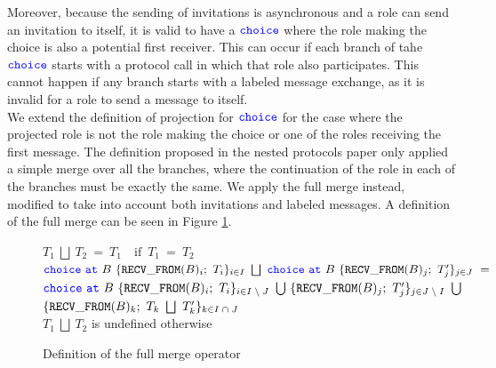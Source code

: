 \documentclass[12pt,twoside]{report}
\begin{document}
Moreover, because the sending of invitations is asynchronous and a role can send an invitation to itself, it is valid to have a ${\color{blue}\mathtt{choice}}$ where the role making the choice is also a potential first receiver. This can occur if each branch of tahe ${\color{blue}\mathtt{choice}}$ starts with a protocol call in which that role also participates. This cannot happen if any branch starts with a labeled message exchange, as it is invalid for a role to send a message to itself.\\


We extend the definition of projection for ${\color{blue}\mathtt{choice}}$ for the case where the projected role is not the role making the choice or one of the roles receiving the first message. The definition proposed in the nested protocols paper only applied a simple merge over all the branches, where the continuation of the role in each of the branches must be exactly the same. We apply the full merge\cite{} instead, modified to take into account both invitations and labeled messages. A definition of the full merge can be seen in Figure \ref{fullmerge}.

\begin{figure}[h]

    \centering

    $T_1\ \bigsqcup\ T_2\ =\ T_1 \quad \text{if}\;\ T_1\ =\ T_2$\\[15pt]

    $\choice\ \at\ B\ \{\mathtt{RECV\_FROM}(B)_i;\ T_i\}_\varinset{i}{I}\ \bigsqcup\ \choice\ \at\ B\ \{\mathtt{RECV\_FROM}(B)_j;\ T'_j\}_\varinset{j}{J}\ =$\\[5pt]
    $\choice\ \at\ B\ \{\mathtt{RECV\_FROM}(B)_i;\ T_i\}_\varinset{i}{I\;\setminus\;J}\ \bigcup\ \{\mathtt{RECV\_FROM}(B)_j;\ T'_j\}_\varinset{j}{J\;\setminus\;I}\ \bigcup$\\
     $\{\mathtt{RECV\_FROM}(B)_k;\ T_k\ \bigsqcup\ T'_k\}_\varinset{k}{I\;\cap\;J}$\\[13pt]




     $T_1\ \bigsqcup\ T_2$ is undefined otherwise\\[7.5pt]

    \caption{Definition of the full merge operator}
    \label{fullmerge}
\end{figure}
\end{document}
